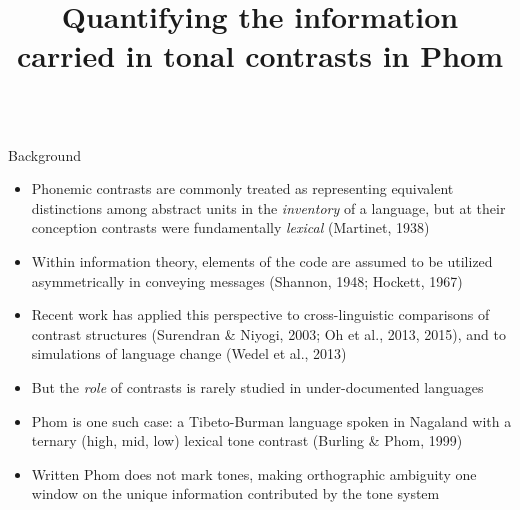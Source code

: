 \documentclass[final]{beamer}
\title{Quantifying the information carried in tonal contrasts in Phom}
\begin{document}

\setlength{\belowcaptionskip}{2ex} %
\setlength\belowdisplayshortskip{2ex} %

\begin{frame}[t] %

\begin{columns}[t] %


\begin{column}{0.85\paperwidth} %

\begin{columns}[t,totalwidth=0.85\paperwidth] %

\begin{column}{0.4\paperwidth}
\vspace{-.6in}


\begin{block}{Background}
  \begin{itemize}
    \item Phonemic contrasts are commonly treated as representing equivalent distinctions among abstract units in the \emph{inventory} of a language, but at their conception contrasts were fundamentally \emph{lexical} {\small (Martinet, 1938)}
    \item Within information theory, elements of the code are assumed to be utilized asymmetrically in conveying messages {\small (Shannon, 1948; Hockett, 1967)}
    \item Recent work has applied this perspective to cross-linguistic comparisons of contrast structures {\small (Surendran \& Niyogi, 2003; Oh et al., 2013, 2015)}, and to simulations of language change {\small (Wedel et al., 2013)}
    \item But the \emph{role} of contrasts is rarely studied in under-documented languages
    \item Phom is one such case: a Tibeto-Burman language spoken in Nagaland with a ternary (high, mid, low) lexical tone contrast {\small (Burling \& Phom, 1999)}
    \item Written Phom does not mark tones, making orthographic ambiguity one window on the unique information contributed by the tone system 
  \end{itemize}
\end{block}


\end{column}
\end{columns}
\end{column}
\end{columns}
\end{frame}
\end{document}
